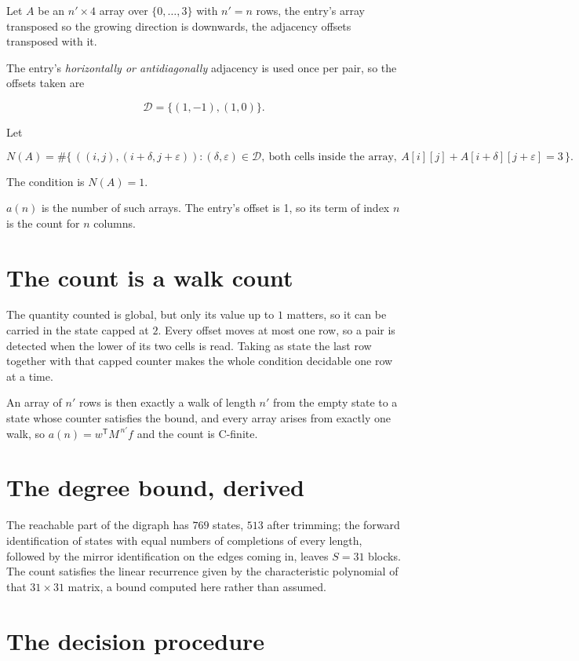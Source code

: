 \documentclass[11pt]{article}
\theoremstyle{definition}
\begin{document}
Let $A$ be an $n' \times 4$ array over $\{0,\dots,3\}$ with $n' = n$ rows, the entry's array transposed so the growing direction is downwards, the adjacency offsets transposed with it.

The entry's {\itshape horizontally or antidiagonally} adjacency is used once per pair, so the offsets taken are

\[\mathcal{D} = \{(1,-1), (1,0)\}.\]

Let

\[N(A) = \#\bigl\{\,((i,j),(i{+}\delta,j{+}\varepsilon)) : (\delta,\varepsilon) \in \mathcal{D},\ \text{both cells inside the array},\ A[i][j] + A[i{+}\delta][j{+}\varepsilon] = 3\,\bigr\}.\]

The condition is $N(A) = 1$.

$a(n)$ is the number of such arrays. The entry's offset is 1, so its term of index $n$ is the count for $n$ columns.

\section{The count is a walk count}

The quantity counted is global, but only its value up to $1$ matters, so it can be carried in the state capped at $2$. Every offset moves at most one row, so a pair is detected when the lower of its two cells is read. Taking as state the last row together with that capped counter makes the whole condition decidable one row at a time.

An array of $n'$ rows is then exactly a walk of length $n'$ from the empty state to a state whose counter satisfies the bound, and every array arises from exactly one walk, so $a(n) = w^{\mathsf T}M^{\,n'}f$ and the count is C-finite.

\section{The degree bound, derived}

The reachable part of the digraph has $769$ states, $513$ after trimming; the forward identification of states with equal numbers of completions of every length, followed by the mirror identification on the edges coming in, leaves $S = 31$ blocks. The count satisfies the linear recurrence given by the characteristic polynomial of that $31\times31$ matrix, a bound computed here rather than assumed.

\section{The decision procedure}
\end{document}
